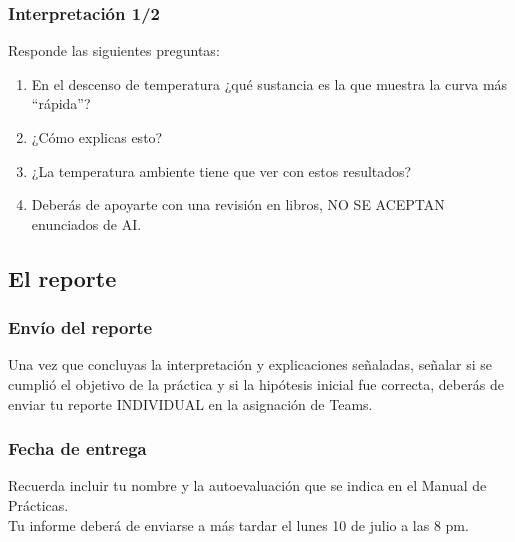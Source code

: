 \documentclass[14pt]{beamer}
\begin{document}
\begin{frame}
\frametitle{Interpretación 1/2}
Responde las siguientes preguntas:
\pause
{}
\begin{enumerate}[<+->]
\item En el descenso de temperatura ¿qué sustancia es la que muestra la curva más \enquote{rápida}?
\item ¿Cómo explicas esto?
\item ¿La temperatura ambiente tiene que ver con estos resultados?
\item Deberás de apoyarte con una revisión en libros, NO SE ACEPTAN enunciados de AI.
\end{enumerate}
\end{frame}

\subsection{El reporte}

\begin{frame}
\frametitle{Envío del reporte}
Una vez que concluyas la interpretación y explicaciones señaladas, señalar si se cumplió el objetivo de la práctica y si la hipótesis inicial fue correcta, \pause deberás de enviar tu reporte INDIVIDUAL en la asignación de Teams.
\end{frame}
\begin{frame}
\frametitle{Fecha de entrega}
Recuerda incluir tu nombre y la autoevaluación que se indica en el Manual de Prácticas.
\\
\bigskip
\pause
Tu informe deberá de enviarse a más tardar el lunes 10 de julio a las 8 pm.
\end{frame}
\end{document}
